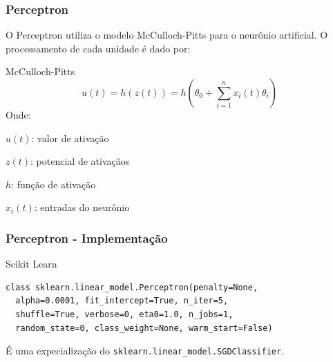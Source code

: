 \documentclass{beamer}
\begin{document}
\begin{frame}
\frametitle{Perceptron}
O Perceptron utiliza o modelo McCulloch-Pitts para o neurônio artificial. O processamento de cada unidade é dado por:
\begin{block}{McCulloch-Pitts}
\[ u(t) = h(z(t)) = h \left( \theta_0 + \sum_{i=1}^n x_i(t) \theta_i \right) \]
Onde:

$u(t)$: valor de ativação

$z(t)$: potencial de ativaçãos

$h$: função de ativação

$x_i(t)$: entradas do neurônio
\end{block}
\end{frame}


\begin{frame}[fragile] %
\frametitle{Perceptron - Implementação}
\begin{block}{Scikit Learn}
\begin{verbatim}
class sklearn.linear_model.Perceptron(penalty=None, 
  alpha=0.0001, fit_intercept=True, n_iter=5, 
  shuffle=True, verbose=0, eta0=1.0, n_jobs=1, 
  random_state=0, class_weight=None, warm_start=False)
\end{verbatim}
\end{block}
É uma expecialização do \verb|sklearn.linear_model.SGDClassifier|.
\end{frame}
\end{document}
